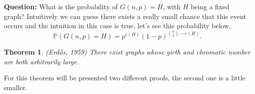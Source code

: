 \documentclass[12pt,twoside,a4paper]{book}
\numberwithin{equation}{section}
\newtheorem{theorem}             {Theorem}[section]
\theoremstyle{remark}
\begin{document}

{\bf Question:} What is the probability of $G(n,p) = H$, with $H$ being a fixed graph?
Intuitively we can guess there exists a really small chance that this event occurs and the intuition in this case is true, let's see this probability below,
$$\mathbb{P}(G(n,p)=H) = p^{e(H)}(1-p)^{\binom{n}{2}-e(H)}.$$

\begin{theorem}(Erd\H{o}s, 1959) There exist graphs whose girth and chromatic number are both arbitrarily large.
\end{theorem}

For this theorem will be presented two different proofs, the second one is a little smaller.
\end{document}
